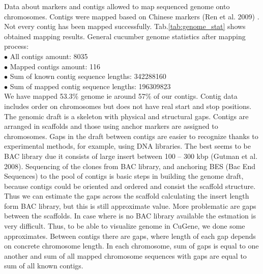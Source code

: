 \documentclass[]{spie}
\newcommand{\appName}{CuGene}
\begin{document}
Data about markers and contigs allowed to map sequenced genome onto chromosomes. Contigs were mapped based on Chinese markers (Ren et al. 2009) . Not every contig has been mapped successfully. Tab.\ref{tab:genome_stat} shows obtained mapping results.
General cucumber genome statistics after mapping process:\\
$\bullet$ All contigs amount: 8035 \\
$\bullet$ Mapped contigs amount: 116 \\
$\bullet$ Sum of known contig sequence lengths: 342288160 \\
$\bullet$ Sum of mapped contig sequence lengths: 196309823 \\
We have mapped 53.3\% genome ie around 57\% of our contigs. Contig data includes order on chromosomes but does not have real start and stop positions. The genomic draft is a skeleton with physical and structural gaps. Contigs  are arranged in scaffolds and those using anchor markers are assigned to chromosomes. Gaps in the draft between contigs are easier to recognize thanks to experimental methods, for example, using DNA libraries. The best seems to be BAC library due it consists of large insert  between 100 – 300 kbp (Gutman et al. 2008). Sequencing of the clones from BAC library, and anchoring BES (Bac End Sequences) to the pool of contigs is basic steps in building the genome draft, because contigs could be oriented and ordered and consist the scaffold structure. Thus we can estimate the gaps across the scaffold calculating the insert length form BAC library, but this is still approximate value. More problematic are gaps between the scaffolds. In case where is no BAC library available the estmation is very difficult. Thus, to be able to visualize genome in \appName{}, we done some approximates. Between contigs there are gaps, where length of each gap depends on concrete chromosome length. In each chromosome, sum of gaps is equal to one another and sum of all mapped chromosome sequences with gaps are equal to sum of all known contigs.
\end{document}
